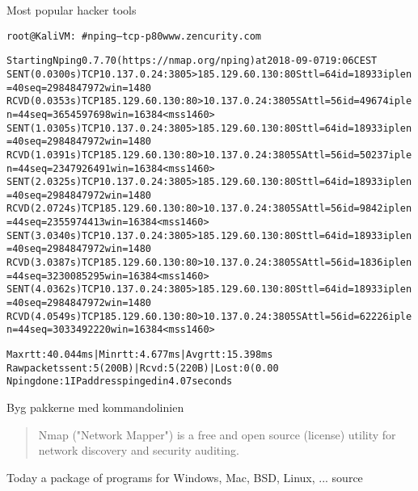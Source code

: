 \documentclass[20pt,landscape,a4paper,footrule]{foils}
\begin{document}
\vskip 5mm
\centerline{Most popular hacker tools }




\begin{alltt}\footnotesize
  root@KaliVM:~# nping --tcp -p 80 www.zencurity.com

  Starting Nping 0.7.70 ( https://nmap.org/nping ) at 2018-09-07 19:06 CEST
  SENT (0.0300s) TCP 10.137.0.24:3805 > 185.129.60.130:80 S ttl=64 id=18933 iplen=40  seq=2984847972 win=1480
  RCVD (0.0353s) TCP 185.129.60.130:80 > 10.137.0.24:3805 SA ttl=56 id=49674 iplen=44  seq=3654597698 win=16384 <mss 1460>
  SENT (1.0305s) TCP 10.137.0.24:3805 > 185.129.60.130:80 S ttl=64 id=18933 iplen=40  seq=2984847972 win=1480
  RCVD (1.0391s) TCP 185.129.60.130:80 > 10.137.0.24:3805 SA ttl=56 id=50237 iplen=44  seq=2347926491 win=16384 <mss 1460>
  SENT (2.0325s) TCP 10.137.0.24:3805 > 185.129.60.130:80 S ttl=64 id=18933 iplen=40  seq=2984847972 win=1480
  RCVD (2.0724s) TCP 185.129.60.130:80 > 10.137.0.24:3805 SA ttl=56 id=9842 iplen=44  seq=2355974413 win=16384 <mss 1460>
  SENT (3.0340s) TCP 10.137.0.24:3805 > 185.129.60.130:80 S ttl=64 id=18933 iplen=40  seq=2984847972 win=1480
  RCVD (3.0387s) TCP 185.129.60.130:80 > 10.137.0.24:3805 SA ttl=56 id=1836 iplen=44  seq=3230085295 win=16384 <mss 1460>
  SENT (4.0362s) TCP 10.137.0.24:3805 > 185.129.60.130:80 S ttl=64 id=18933 iplen=40  seq=2984847972 win=1480
  RCVD (4.0549s) TCP 185.129.60.130:80 > 10.137.0.24:3805 SA ttl=56 id=62226 iplen=44  seq=3033492220 win=16384 <mss 1460>

  Max rtt: 40.044ms | Min rtt: 4.677ms | Avg rtt: 15.398ms
  Raw packets sent: 5 (200B) | Rcvd: 5 (220B) | Lost: 0 (0.00%)
  Nping done: 1 IP address pinged in 4.07 seconds
\end{alltt}

\vskip 1cm
\centerline{Byg pakkerne med kommandolinien}



\begin{quote}
Nmap ("Network Mapper") is a free and open source (license) utility for network discovery and security auditing.
\end{quote}

\centerline{Today a package of programs for Windows, Mac, BSD, Linux, ... source}
\end{document}
